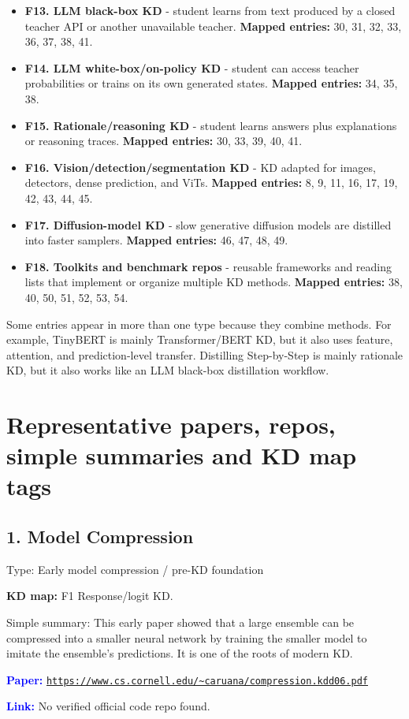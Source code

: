 \documentclass[10pt]{article}
\begin{document}
\begin{itemize}
\item \textbf{F13. LLM black-box KD} - student learns from text produced by a closed teacher API or another unavailable teacher. 
\textbf{Mapped entries:} 30, 31, 32, 33, 36, 37, 38, 41.

\item \textbf{F14. LLM white-box/on-policy KD} - student can access teacher probabilities or trains on its own generated states. 
\textbf{Mapped entries:} 34, 35, 38.

\item \textbf{F15. Rationale/reasoning KD} - student learns answers plus explanations or reasoning traces. 
\textbf{Mapped entries:} 30, 33, 39, 40, 41.

\item \textbf{F16. Vision/detection/segmentation KD} - KD adapted for images, detectors, dense prediction, and ViTs. 
\textbf{Mapped entries:} 8, 9, 11, 16, 17, 19, 42, 43, 44, 45.

\item \textbf{F17. Diffusion-model KD} - slow generative diffusion models are distilled into faster samplers. 
\textbf{Mapped entries:} 46, 47, 48, 49.

\item \textbf{F18. Toolkits and benchmark repos} - reusable frameworks and reading lists that implement or organize multiple KD methods. 
\textbf{Mapped entries:} 38, 40, 50, 51, 52, 53, 54.

\end{itemize}

Some entries appear in more than one type because they combine methods. For example, TinyBERT is mainly Transformer/BERT KD, but it also uses feature, attention, and prediction-level transfer. Distilling Step-by-Step is mainly rationale KD, but it also works like an LLM black-box distillation workflow.\par

\section*{Representative papers, repos, simple summaries and KD map tags}
\subsection*{1. Model Compression}
Type: Early model compression / pre-KD foundation\par
\textbf{KD map:} F1 Response/logit KD.\par
Simple summary: This early paper showed that a large ensemble can be compressed into a smaller neural network by training the smaller model to imitate the ensemble's predictions. It is one of the roots of modern KD.\par
\textcolor{blue}{\textbf{Paper:}} \href{https://www.cs.cornell.edu/~caruana/compression.kdd06.pdf}{\nolinkurl{https://www.cs.cornell.edu/~caruana/compression.kdd06.pdf}}\par
\textcolor{blue}{\textbf{Link:}} No verified official code repo found.\par
\end{document}
